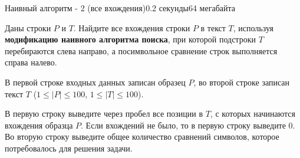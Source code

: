 \begin{problem}{Наивный алгоритм - 2 (все вхождения)}{}{}{0.2 секунды}{64 мегабайта}

Даны строки $P$ и $T$. Найдите все вхождения строки $P$ в текст $T$, используя {\bf модификацию наивного алгоритма поиска}, 
при которой подстроки $T$ перебираются слева направо, а посимвольное сравнение строк выполняется справа налево.

\InputFile
В первой строке входных данных записан образец $P$, 
во второй строке записан текст $T$ ($1 \le |P| \le 100$, $1 \le |T| \le 100$).


\OutputFile
В первую строку выведите через пробел все позиции в $T$, с которых начинаются вхождения образца $P$. 
Если вхождений не было, то в первую строку выведите 0.
Во вторую строку выведите общее количество сравнений символов, которое потребовалось для решения задачи. 

\Examples

\begin{example}
%
\end{example}

\end{problem}
